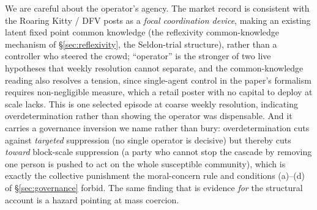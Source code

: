 \documentclass[11pt]{article}
\begin{document}
We are careful about the operator's agency. The market record is consistent with the Roaring Kitty / DFV posts as a \emph{focal coordination device}, making an existing latent fixed point common knowledge (the reflexivity common-knowledge mechanism of \S\ref{sec:reflexivity}, the Seldon-trial structure), rather than a controller who steered the crowd; ``operator'' is the stronger of two live hypotheses that weekly resolution cannot separate, and the common-knowledge reading also resolves a tension, since single-agent control in the paper's formalism requires non-negligible measure, which a retail poster with no capital to deploy at scale lacks. This is one selected episode at coarse weekly resolution, indicating overdetermination rather than showing the operator was dispensable. And it carries a governance inversion we name rather than bury: overdetermination cuts against \emph{targeted} suppression (no single operator is decisive) but thereby cuts \emph{toward} block-scale suppression (a party who cannot stop the cascade by removing one person is pushed to act on the whole susceptible community), which is exactly the collective punishment the moral-concern rule and conditions (a)--(d) of \S\ref{sec:governance} forbid. The same finding that is evidence \emph{for} the structural account is a hazard pointing at mass coercion.
\end{document}
